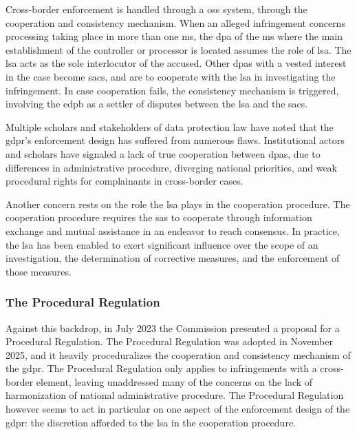 Cross-border enforcement is handled through a \gls{oss} system,\autocite[recital 127]{GDPR} through the cooperation and consistency mechanism.\autocite[chapter VII]{GDPR} 
When an alleged infringement concerns processing taking place in more than one \gls{ms}, the \gls{dpa} of the \gls{ms} where the main establishment of the controller or processor is located assumes the role of \gls{lsa}.\autocite[56(1)]{GDPR}
The \gls{lsa} acts as the sole interlocutor of the accused.\autocite[63]{facebookBelgium}
Other \glspl{dpa} with a vested interest in the case become \glspl{sac}, and are to cooperate with the \gls{lsa} in investigating the infringement.\autocite[60]{GDPR}
In case cooperation fails, the consistency mechanism is triggered,  involving the \gls{edpb} as a settler of disputes between the \gls{lsa} and the \glspl{sac}.\autocite[arts 63--66]{GDPR}

Multiple scholars and stakeholders of data protection law have noted that the \gls{gdpr}'s enforcement design has suffered from numerous flaws.
Institutional actors and scholars have signaled a lack of true cooperation between \glspl{dpa}, due to differences in administrative procedure,\autocites[324--325]{mustertCrossborderEnforcementGDPR}[1, 3, 4]{EDPBLetterEUComm} diverging national priorities,\autocite[806]{gentileDeficientDesign2022} and weak procedural rights for complainants in cross-border cases.\autocite[800]{gentileDeficientDesign2022} 

Another concern rests on the role the \gls{lsa} plays in the cooperation procedure. 
The cooperation procedure requires the \glspl{sa} to cooperate through information exchange and mutual assistance in an endeavor to reach consensus.\autocites[60(1) and (2)]{GDPR}[point 111]{fbBelgiumAgBobek}
In practice, the \gls{lsa} has been enabled to exert significant influence over the scope of an investigation, the determination of corrective measures, and the enforcement of those measures.\autocite[809]{gentileDeficientDesign2022}

\subsubsection{The Procedural Regulation}
\label{sec:ch1-procedural-regulation}

Against this backdrop, in July 2023 the Commission presented a proposal for a Procedural Regulation.\autocite{ProposalProcReg} 
The Procedural Regulation was adopted in November 2025, and it heavily proceduralizes the cooperation and consistency mechanism of the \gls{gdpr}.
The Procedural Regulation only applies to infringements with a cross-border element,\autocite[499]{mustertProceduralisingEnforcement2026} leaving unaddressed many of the concerns on the lack of harmonization of national administrative procedure.\autocite[499 and 506]{mustertProceduralisingEnforcement2026}
The Procedural Regulation however seems to act in particular on one aspect of the enforcement design of the \gls{gdpr}: the discretion afforded to the \gls{lsa} in the cooperation procedure. 

